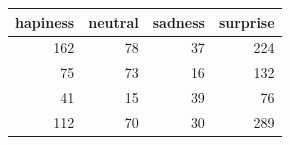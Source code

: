 \begin{tabular}{rrrr}
\toprule
hapiness & neutral & sadness & surprise \\
\midrule
162 & 78 & 37 & 224 \\
75 & 73 & 16 & 132 \\
41 & 15 & 39 & 76 \\
112 & 70 & 30 & 289 \\
\bottomrule
\end{tabular}
